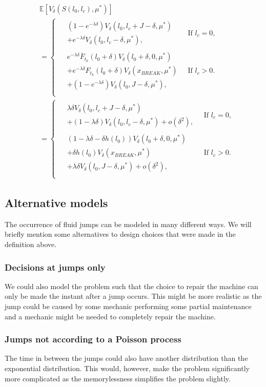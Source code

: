 \begin{equation}\label{eq:SimpleFluidNextState}
\begin{split}
&\mathbb{E}[V_\delta(S(l_0,l_c),\mu^*)]\\
&=\begin{cases}
\begin{split}
&(1-e^{-\lambda \delta})V_\delta(l_0,l_c+J-\delta,\mu^*)\\
&+e^{-\lambda \delta}V_\delta(l_0,l_c-\delta,\mu^*),
\end{split}&\ \text{If $l_c=0$,}\\
\begin{split}
&e^{-\lambda \delta} \bar{F}_{t_k}(l_0+\delta)V_\delta(l_0+\delta,0,\mu^*)\\
&+ e^{-\lambda \delta}F_{t_k}(l_0+\delta)V_\delta(x_{BREAK},\mu^*)\\
&+(1-e^{-\lambda \delta})V_\delta(l_0,J-\delta,\mu^*),
\end{split}&\ \text{If $l_c>0$.}\\
\end{cases}\\
&=\begin{cases}
\begin{split}
&\lambda\delta V_\delta(l_0,l_c+J-\delta,\mu^*)\\
&+(1-\lambda \delta)V_\delta(l_0,l_c-\delta,\mu^*)+o(\delta^2),
\end{split}
&\ \text{If $l_c=0$,}\\
\begin{split}
&(1-\lambda \delta-\delta h(l_0))V_\delta(l_0+\delta,0,\mu^*)\\
&+ \delta h(l_0)V_\delta(x_{BREAK},\mu^*)\\
&+\lambda \delta V_\delta(l_0,J-\delta,\mu^*)+o(\delta^2),
\end{split}&\ \text{If $l_c>0$.}\\
\end{cases}
\end{split}
\end{equation}

\subsection{Alternative models}
The occurrence of fluid jumps can be modeled in many different ways.
We will briefly mention some alternatives to design choices that were made in the definition above.
\subsubsection{Decisions at jumps only}
We could also model the problem such that the choice to repair the machine can only be made the instant after a jump occurs.
This might be more realistic as the jump could be caused by some mechanic performing some partial maintenance and a mechanic might be needed to completely repair the machine.

\subsubsection{Jumps not according to a Poisson process}
The time in between the jumps could also have another distribution than the exponential distribution.
This would, however, make the problem significantly more complicated as the memorylessness simplifies the problem slightly.